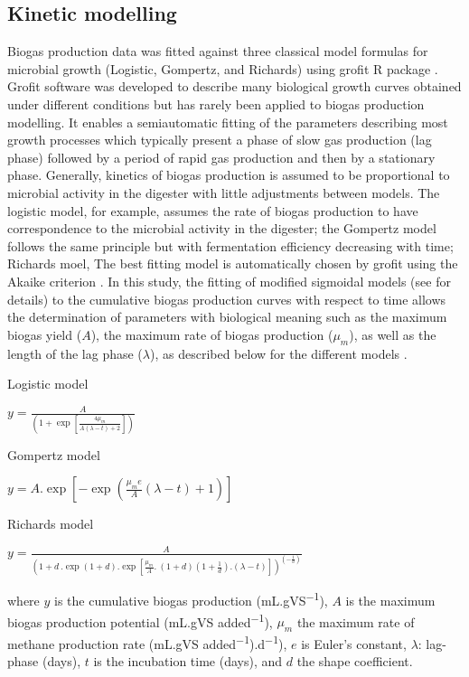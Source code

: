 \subsection{Kinetic modelling}
Biogas production data was fitted against three classical model formulas for microbial growth (Logistic, Gompertz, and Richards) using grofit R package \cite{Kahm_2010}. Grofit software was developed to describe many biological growth curves obtained under different conditions but has rarely been applied to biogas production modelling. It enables a semiautomatic fitting of the parameters describing most growth processes which typically present a phase of slow gas production (lag phase) followed by a period of rapid gas production and then by a stationary phase. Generally, kinetics of biogas production is assumed to be proportional to microbial activity in the digester with little adjustments between models. The logistic model, for example, assumes the rate of biogas production to have correspondence to the microbial activity in the digester; the Gompertz model follows the same principle but with fermentation efficiency decreasing with time; Richards moel, The best fitting model is automatically chosen by grofit using the Akaike criterion \cite{Hasenbrink_2006}. In this study, the fitting of modified sigmoidal models (see \cite{Zwietering1990} for details) to the cumulative biogas production curves with respect to time allows the determination of parameters with biological meaning such as the maximum biogas yield ($A$), the maximum rate of biogas production ($μ_m$), as well as the length of the lag phase ($λ$), as described below for the different models \cite{Zwietering1990,Ware_2017,Alta__2009}.

Logistic model

\(y=\frac{A}{\left(1+\exp\left[\frac{4\mu_m}{A\left(\lambda-t\right)+2}\right]\right)}\)

Gompertz model

\(y=A.\exp\left[-\exp\left(\frac{\mu_me}{A}\left(\lambda-t\right)+1\right)\right]\)

Richards model

\(y=\frac{A}{\left(1+d\ .\exp\left(1+d\right).\exp\left[\frac{\mu_m}{A}.\ \left(1+d\right)\left(1+\frac{1}{d}\right).\left(\lambda-t\right)\right]\right)^{\left(-\frac{1}{d}\right)}}\)


where $y$ is the cumulative biogas production (mL.gVS\textsuperscript{−1}), $A$ is the maximum biogas production potential (mL.gVS added\textsuperscript{−1}), $μ_m$ the maximum rate of methane production rate (mL.gVS added\textsuperscript{−1}).d\textsuperscript{−1}), $e$ is Euler's constant, $λ$: lag-phase (days), $t$ is the incubation time (days), and $d$ the shape coefficient.